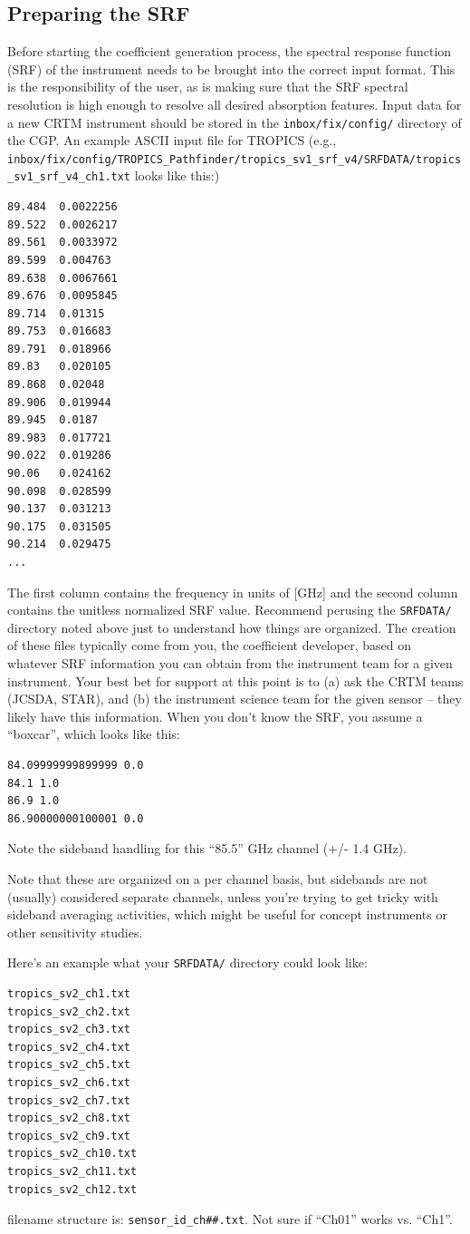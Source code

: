 \subsection{Preparing the SRF}
Before starting the coefficient generation process, the spectral response function (SRF) of the instrument needs to be brought into the correct input format. 
This is the responsibility of the user, as is making sure that the SRF spectral resolution is high enough to resolve all desired absorption features.
Input data for a new CRTM instrument should be stored in the \verb|inbox/fix/config/| directory of the CGP.
An example ASCII input file for TROPICS (e.g., \verb|inbox/fix/config/TROPICS_Pathfinder/tropics_sv1_srf_v4/SRFDATA/tropics_sv1_srf_v4_ch1.txt| looks like this:)
\begin{verbatim}
89.484  0.0022256
89.522  0.0026217
89.561  0.0033972
89.599  0.004763
89.638  0.0067661
89.676  0.0095845
89.714  0.01315
89.753  0.016683
89.791  0.018966
89.83   0.020105
89.868  0.02048
89.906  0.019944
89.945  0.0187
89.983  0.017721
90.022  0.019286
90.06   0.024162
90.098  0.028599
90.137  0.031213
90.175  0.031505
90.214  0.029475
...
\end{verbatim}
The first column contains the frequency in units of [GHz] and the second column contains the unitless normalized SRF value.
Recommend perusing the \verb|SRFDATA/| directory noted above just to understand how things are organized.   The creation of these files typically come from you, the coefficient developer, based on whatever SRF information you can obtain from the instrument team for a given instrument.  Your best bet for support at this point is to (a) ask the CRTM teams (JCSDA, STAR), and (b) the instrument science team for the given sensor -- they likely have this information.    When you don't know the SRF, you assume a ``boxcar'', which looks like this:
\begin{verbatim}
84.09999999899999 0.0
84.1 1.0
86.9 1.0
86.90000000100001 0.0
\end{verbatim}
Note the sideband handling for this ``85.5'' GHz channel (+/- 1.4 GHz).  

Note that these are organized on a per channel basis, but sidebands are not (usually) considered separate channels, unless you're trying to get tricky with sideband averaging activities, which might be useful for concept instruments or other sensitivity studies. 

Here's an example what your \verb|SRFDATA/| directory could look like:
\begin{verbatim}
tropics_sv2_ch1.txt
tropics_sv2_ch2.txt
tropics_sv2_ch3.txt
tropics_sv2_ch4.txt
tropics_sv2_ch5.txt
tropics_sv2_ch6.txt
tropics_sv2_ch7.txt
tropics_sv2_ch8.txt
tropics_sv2_ch9.txt
tropics_sv2_ch10.txt
tropics_sv2_ch11.txt
tropics_sv2_ch12.txt
\end{verbatim}
filename structure is: \verb|sensor_id_ch##.txt|.  Not sure if ``Ch01'' works vs. ``Ch1''.  

